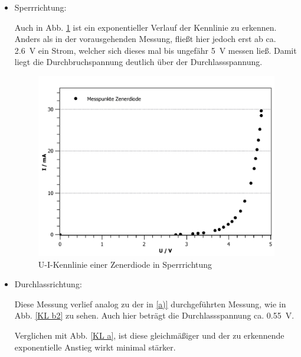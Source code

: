 \documentclass[11pt,a4paper,titlepage, ngerman]{article}
\begin{document}
				 \begin{itemize}
				 	
				 	\item Sperrrichtung: 
				 	
				 	Auch in Abb. \ref{KL b1} ist ein exponentieller Verlauf der Kennlinie zu erkennen.
				 	Anders als in der vorausgehenden Messung, fließt hier jedoch erst ab ca. \SI{2.6}{\volt} ein Strom, welcher sich dieses mal bis ungefähr \SI{5}{\volt} messen ließ.
				 	Damit liegt die Durchbruchspannung deutlich über der Durchlassspannung.
				 	
				 	\begin{figure}[ht]
				 		\centering
				 		\includegraphics[width=\textwidth]{KennlinieZenerdiodeSperrrichtung_2.pdf}
				 		\caption{U-I-Kennlinie einer Zenerdiode in Sperrrichtung}
				 		\label{KL b1}
				 	\end{figure}
				 	
				 	\item Durchlassrichtung:  
				 	
				 	Diese Messung verlief analog zu der in \ref{a)} durchgeführten Messung, wie in Abb. \ref{KL b2} zu sehen.
				 	Auch hier beträgt die Durchlassspannung ca. \SI{0,55}{\volt}.

				 	Verglichen mit Abb. \ref{KL a}, ist diese gleichmäßiger und der zu erkennende exponentielle Anstieg wirkt minimal stärker.
				 	

\end{itemize}
\end{document}
